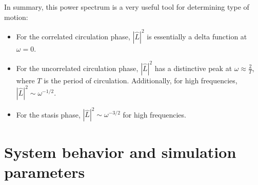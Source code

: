 \documentclass[11pt]{ucthesis}
\begin{document}
In summary, this power spectrum is a very useful tool for determining type of motion:
\begin{itemize}
\item For the correlated circulation phase, $|\hat{L}|^2$ is essentially a delta function at $\omega=0$.
\item For the uncorrelated circulation phase, $|\hat{L}|^2$ has a distinctive peak at $\omega \approx \frac2T$, where $T$ is the period of circulation. Additionally, for high frequencies, $|\hat{L}|^2\sim \omega^{-1/2}$.
\item For the stasis phase, $|\hat{L}|^2\sim \omega^{-3/2}$ for high frequencies.
\end{itemize}

\section{System behavior and simulation parameters}
\label{app:categories}
\end{document}
